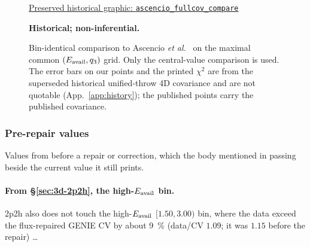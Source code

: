 \begin{figure}[H]
  \centering
  \par\href{https://github.com/josephbaileyy/MINERvA-OmniFold/blob/3892e769043cddebfd58ec19e1ab1a567eb01784/docs/analysis-note/figures/ascencio_fullcov_compare.pdf}{Preserved historical graphic: \texttt{ascencio\_fullcov\_compare}} \par\smallskip\textbf{Historical; non-inferential.}
  \caption{Bin-identical comparison to Ascencio \emph{et al.}~\cite{MINERvA:2022incl} on the maximal common $(E_{\mathrm{avail}},q_{3})$ grid. Only the central-value comparison is used. The error bars on our points and the printed $\chi^{2}$ are from the superseded historical unified-throw 4D covariance and are not quotable (App.~\ref{app:history}); the published points carry the published covariance.}
  \label{fig:ascencio-superseded}
\end{figure}

\subsubsection{Pre-repair values}
\label{app:history-prerepair}
Values from before a repair or correction, which the body mentioned in passing beside the current value it still prints.

\paragraph{From \S\ref{sec:3d-2p2h}, the high-$E_{\mathrm{avail}}$ bin.} 2p2h also does not touch the high-$E_{\mathrm{avail}}$ $[1.50,3.00)$ bin, where the data exceed the flux-repaired GENIE CV by about \SI{9}{\percent} (data/CV $1.09$; it was $1.15$ before the repair) \ldots

